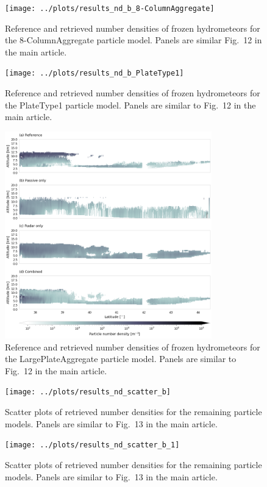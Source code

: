 \documentclass[journal abbreviation, manuscript]{copernicus}
\begin{document}
\begin{figure}[!hbpt]
\centering
\texttt{[image: ../plots/results\_nd\_b\_8-ColumnAggregate]}
\caption{Reference and retrieved number densities of frozen hydrometeors for the
  8-ColumnAggregate particle model. Panels are similar Fig.~12 in the main article.}
\end{figure}
\clearpage

\begin{figure}[!hbpt]
\centering
\texttt{[image: ../plots/results\_nd\_b\_PlateType1]}
\caption{Reference and retrieved number densities of frozen hydrometeors for the
  PlateType1 particle model. Panels are similar to Fig.~12 in the main article.}
\end{figure}
\clearpage

\begin{figure}[!hbpt]
\centering
\includegraphics[width = 0.8\textwidth]{../plots/results_nd_b_LargePlateAggregate}
\caption{Reference and retrieved number densities of frozen hydrometeors for the
  LargePlateAggregate particle model. Panels are similar to Fig.~12 in the main article.}
\end{figure}
\clearpage

\begin{figure}[!hbpt]
\centering
\texttt{[image: ../plots/results\_nd\_scatter\_b]}
\caption{Scatter plots of retrieved number densities for the remaining particle models. Panels
are similar to Fig.~13 in the main article.}
\end{figure}

\begin{figure}[!hbpt]
\centering
\texttt{[image: ../plots/results\_nd\_scatter\_b\_1]}
\caption{Scatter plots of retrieved number densities for the remaining particle models. Panels
are similar to Fig.~13 in the main article.}
\end{figure}
\clearpage
\end{document}
